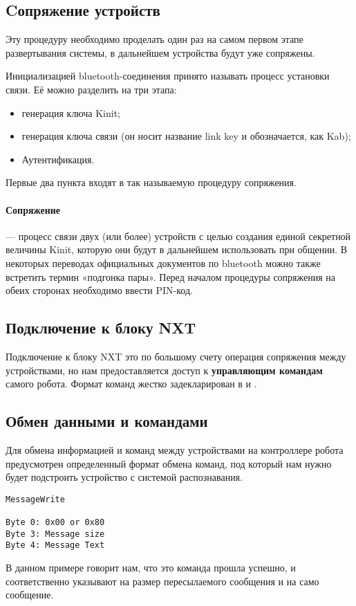 \subsection{Cопряжение устройств}
Эту процедуру необходимо проделать один раз на самом первом этапе развертывания системы, в дальнейшем устройства будут уже сопряжены.

Инициализацией bluetooth-соединения принято называть процесс установки связи. Её можно разделить на три этапа:

\begin{itemize}
 \item генерация ключа Kinit;
 \item генерация ключа связи (он носит название link key и обозначается, как Kab);
 \item Аутентификация.
\end{itemize}

Первые два пункта входят в так называемую процедуру сопряжения.

\paragraph{Сопряжение}  — процесс связи двух (или более) устройств с целью создания единой секретной величины Kinit, которую они будут в дальнейшем использовать при общении. В некоторых переводах официальных документов по bluetooth можно также встретить термин «подгонка пары». Перед началом процедуры сопряжения на обеих сторонах необходимо ввести PIN-код.

\subsection{Подключение к блоку NXT}
Подключение к блоку NXT это по большому счету операция сопряжения между устройствами, но нам предоставляется доступ к \textbf{управляющим командам} самого робота.
Формат команд жестко задекларирован  в \cite{Pup09} и \cite{Pup10}. 

\subsection{Обмен данными и командами}

Для обмена информацией и команд между устройствами на контроллере робота предусмотрен определенный формат обмена команд, под который нам нужно будет подстроить устройство с системой распознавания.

\begin{lstlisting}[caption=Формат команд для получения потока данных]
MessageWrite

Byte 0: 0x00 or 0x80
Byte 3: Message size
Byte 4: Message Text
\end{lstlisting}
В данном примере  говорит нам, что это команда прошла успешно,  и  соответственно указывают на размер пересылаемого сообщения и на само сообщение.

